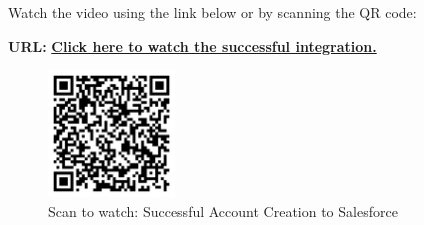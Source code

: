 \noindent Watch the video using the link below or by scanning the QR code:

\noindent \textbf{URL:} \href{https://drive.google.com/file/d/1YJu7LIanmCPygF6MYpwy4AShSuE6Bh88/view?usp=drive_link}{\textbf{Click here to watch the successful integration.}}

\begin{figure}[h]
    \centering
    \includegraphics[width=0.3\textwidth]{Appendix/images/Success_QR.png} %
    \caption{Scan to watch: Successful Account Creation to Salesforce}
    \label{fig:success_video}
\end{figure}



\newpage
